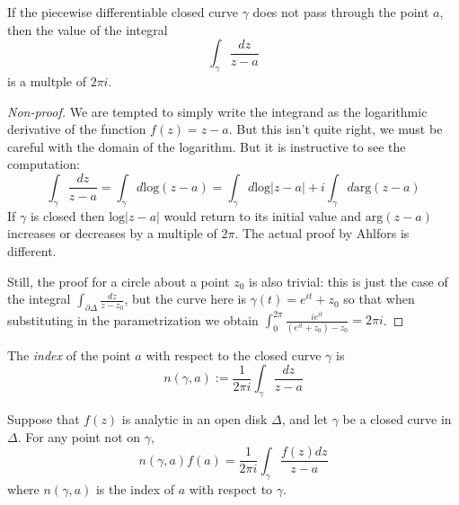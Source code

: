 \begin{lemma}
\label{lemma-index-is-multiple-of-2pii}
\begin{reference}
\cite[Section 2.2, Lemma 1]{ahl}
\end{reference}
If the piecewise differentiable closed curve $\gamma$ does not pass through the
point $a$, then the value of the integral
$$
\int_\gamma\frac{dz}{z-a}
$$
is a multple of $2\pi i$.
\end{lemma}

\begin{proof}[Non-proof]
We are tempted to simply write the integrand as the logarithmic derivative of
the function $f(z)=z-a$. But this isn't quite right, we must be careful with the
domain of the logarithm. But it is instructive to see the computation:
$$
\int_\gamma\frac{dz}{z-a}=\int_\gamma d \text{log}(z-a)=
\int_\gamma d\text{log}|z-a|+i\int_\gamma d \text{arg}(z-a)
$$
If  $\gamma$ is closed then $\text{log}|z-a|$ would return to its initial value
and $\text{arg}(z-a)$ increases or decreases by a multiple of $2\pi$. The actual
proof by Ahlfors is different.

Still, the proof for a circle about a point $z_0$ is also trivial: this is just
the case of the integral $\int_{\partial\Delta}\frac{dz}{z-z_0}$, but the curve
here is  $\gamma(t)=e^{it}+z_0$ so that when substituting in the parametrization
we obtain $\int_0^{2\pi}\frac{ie^{it}}{(e^{it}+z_0)-z_0}=2\pi i$.
\end{proof}

\begin{definition}
\label{definition-index}
The {\it index} of the point $a$ with respect to the closed curve $\gamma$ is
\begin{equation}
\label{equation-index}
n(\gamma,a):=\frac{1}{2\pi i}\int_\gamma\frac{dz}{z-a}
\end{equation}
\end{definition}

\begin{theorem}
\label{theorem-Cauchy-integral-formula}
\begin{reference}
\cite[Section 2.2, Theorem 6]{ahl}
\end{reference}
Suppose that $f(z)$ is analytic in an open disk $\Delta$, and let $\gamma$ be a
closed curve in $\Delta$. For any point not on $\gamma$,
\begin{equation}
\label{equation-Cauchy-formula-with-index}
n(\gamma,a)f(a)=\frac{1}{2\pi i}\int_\gamma\frac{f(z)dz}{z-a}
\end{equation}
where $n(\gamma,a)$ is the index of $a$ with respect to $\gamma$.
\end{theorem}

